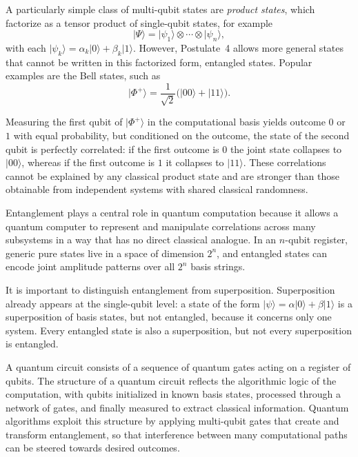 \documentclass[12pt,a4paper,openany]{report}
\newcommand{\ket}[1]{\lvert #1 \rangle}
\begin{document}
A particularly simple class of multi-qubit states are \emph{product states}, which factorize as a tensor product of single-qubit states, for example
\begin{equation}
  \ket{\Psi} = \ket{\psi_1} \otimes \cdots \otimes \ket{\psi_n},
\end{equation}
with each $\ket{\psi_k} = \alpha_k \ket{0} + \beta_k \ket{1}$. However, Postulate~4 allows more general states that cannot be written in this factorized form, entangled states. Popular examples are the Bell states, such as
\begin{equation}
  \ket{\Phi^+} = \frac{1}{\sqrt{2}}\big(\ket{00} + \ket{11}\big).
\end{equation}

Measuring the first qubit of $\ket{\Phi^+}$ in the computational basis yields outcome $0$ or $1$ with equal probability, but conditioned on the outcome, the state of the second qubit is perfectly correlated: if the first outcome is $0$ the joint state collapses to $\ket{00}$, whereas if the first outcome is $1$ it collapses to $\ket{11}$. These correlations cannot be explained by any classical product state and are stronger than those obtainable from independent systems with shared classical randomness.

Entanglement plays a central role in quantum computation because it allows a quantum computer to represent and manipulate correlations across many subsystems in a way that has no direct classical analogue. In an $n$-qubit register, generic pure states live in a space of dimension $2^n$, and entangled states can encode joint amplitude patterns over all $2^n$ basis strings. 

It is important to distinguish entanglement from superposition. Superposition already appears at the single-qubit level: a state of the form $\ket{\psi} = \alpha\ket{0} + \beta\ket{1}$ is a superposition of basis states, but not entangled, because it concerns only one system. Every entangled state is also a superposition, but not every superposition is entangled. 

A quantum circuit consists of a sequence of quantum gates acting on a register of qubits. The structure of a quantum circuit reflects the algorithmic logic of the computation, with qubits initialized in known basis states, processed through a network of gates, and finally measured to extract classical information. Quantum algorithms exploit this structure by applying multi-qubit gates that create and transform entanglement, so that interference between many computational paths can be steered towards desired outcomes.
\end{document}
